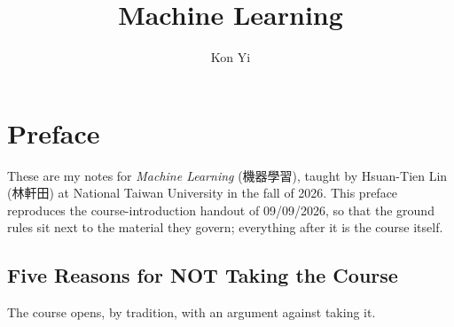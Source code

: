 \documentclass[a4paper,oneside]{scrbook}
\author{Kon Yi}
\title{Machine Learning}
\begin{document}
\maketitle

\chapter*{Preface}

These are my notes for \emph{Machine Learning} (機器學習), taught by Hsuan-Tien
Lin (林軒田) at National Taiwan University in the fall of 2026. This preface
reproduces the course-introduction handout of 09/09/2026, so that the ground
rules sit next to the material they govern; everything after it is the course
itself.

\section*{Five Reasons for NOT Taking the Course}

The course opens, by tradition, with an argument against taking it.
\end{document}
